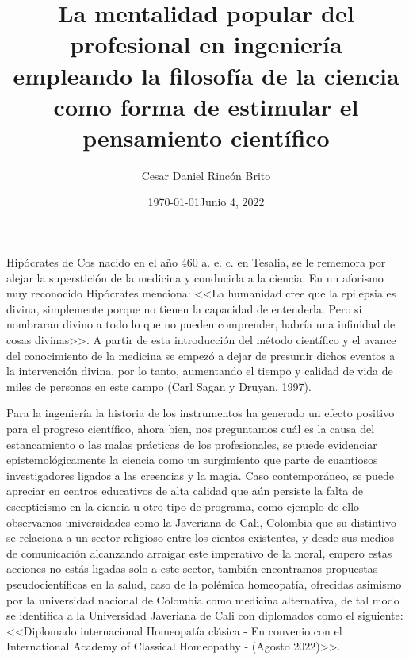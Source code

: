 \documentclass[letterpaper,12pt]{article}
\begin{document}
\title{La mentalidad popular del profesional en ingeniería empleando la filosofía de la ciencia como forma de estimular el pensamiento científico}
\author{\normalsize{Cesar Daniel Rincón Brito}}
\date{\normalsize{\today}}
\date{Junio 4, 2022}
\maketitle

\thispagestyle{empty}
\pagestyle{empty}

Hipócrates de Cos nacido en el año 460 a. e. c. en Tesalia, se le rememora por alejar la superstición de la medicina y conducirla a la ciencia. En un aforismo muy reconocido Hipócrates menciona: <<La humanidad cree que la epilepsia es divina, simplemente porque no tienen la capacidad de entenderla. Pero si nombraran divino a todo lo que no pueden comprender, habría una infinidad de cosas divinas>>.  A partir de esta introducción del método científico y el avance del conocimiento de la medicina se empezó a dejar de presumir dichos eventos a la intervención divina, por lo tanto, aumentando el tiempo y calidad de vida de miles de personas en este campo (Carl Sagan y Druyan, 1997).
\newline %

Para la ingeniería la historia de los instrumentos ha generado un efecto positivo para el progreso científico, ahora bien, nos preguntamos cuál es la causa del estancamiento o las malas prácticas de los profesionales, se puede evidenciar epistemológicamente la ciencia como un surgimiento que parte de cuantiosos investigadores ligados a las creencias y la magia. Caso contemporáneo, se puede apreciar en centros educativos de alta calidad que aún persiste la falta de escepticismo en la ciencia u otro tipo de programa, como ejemplo de ello observamos universidades como la Javeriana de Cali, Colombia que su distintivo se relaciona a un sector religioso entre los cientos existentes, y desde sus medios de comunicación alcanzando arraigar este imperativo de la moral, empero estas acciones no estás ligadas solo a este sector, también encontramos propuestas pseudocientíficas en la salud, caso de la polémica homeopatía, ofrecidas asimismo por la universidad nacional de Colombia como medicina alternativa, de tal modo se identifica a la Universidad Javeriana de Cali con diplomados como el siguiente: <<Diplomado internacional Homeopatía clásica - En convenio con el International Academy of Classical Homeopathy - (Agosto 2022)>>.
\newline %
\end{document}
